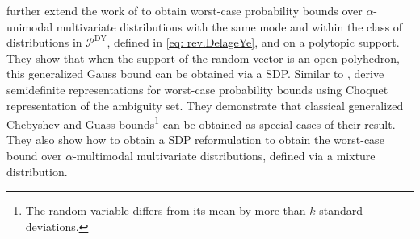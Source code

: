 \documentclass[final,onefignum,onetabnum]{class}
\newcommand{\Cs}[1]{\mathcal{#1}} %
\begin{document}
 \citet{vanparys2016SDP}  further extend the work of \citet{popescu2005semidefinite} %
to obtain worst-case probability bounds over $\alpha$-unimodal multivariate distributions with the same mode and within the class of distributions in $\Cs{P}^{\text{DY}}$, defined in \eqref{eq: rev.DelageYe}, and on a  polytopic support. They show that when the support of the random vector is an open polyhedron, this generalized Gauss bound can be obtained  via a SDP. 
Similar to  \citet{popescu2005semidefinite}, \citet{vanparys2016SDP} derive semidefinite representations for worst-case probability bounds using Choquet representation of the ambiguity set. They  demonstrate that classical generalized Chebyshev and Guass bounds\footnote{The random variable differs from its mean by more than $k$
standard deviations.}  can be obtained as special cases of their result. They also show how to obtain a SDP reformulation to obtain the worst-case bound over $\alpha$-multimodal multivariate distributions, defined via a mixture distribution. 
\end{document}
